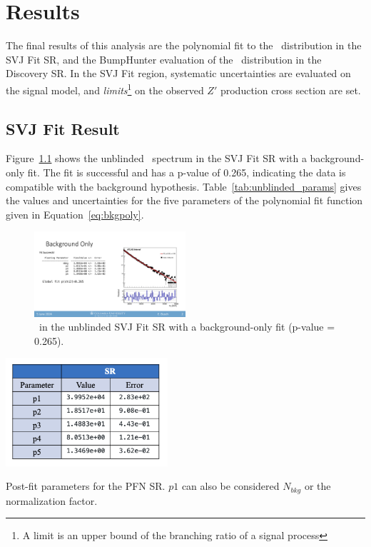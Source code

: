 \chapter{Results}
\label{ch:results}
The final results of this analysis are the polynomial fit to the \mt~distribution in the SVJ Fit SR, and the BumpHunter evaluation of the \mt~distribution in the Discovery SR. In the SVJ Fit region, systematic uncertainties are evaluated on the signal model, and \textit{limits}\footnote{A limit is an upper bound of the branching ratio of a signal process} on the observed $Z'$ production cross section are set. 

\section{SVJ Fit Result}
\label{sec:results_svj}
Figure~\ref{fig:unblinded_PFN_bonly} shows the unblinded \mt~spectrum in the SVJ Fit SR with a background-only fit. 
The fit is successful and has a p-value of 0.265, indicating the data is compatible with the background hypothesis. 
Table~\ref{tab:unblinded_params} gives the values and uncertainties for the five parameters of the polynomial fit function given in Equation~\ref{eq:bkgpoly}. 
\begin{figure}[!htbp]
\centering
   \includegraphics[width=0.5\textwidth]{figures/results/unblinded_PFN_bonly}
    \caption{\mt~in the unblinded SVJ Fit SR with a background-only fit (p-value = 0.265).
    \label{fig:unblinded_PFN_bonly}}
\end{figure}

\begin{table}[!htbp]
\centering
   \includegraphics[width=0.45\textwidth]{figures/results/postfit_param_pfnSR}
    \caption{Post-fit parameters for the PFN SR. $p1$ can also be considered $N_{bkg}$ or the normalization factor.
    \label{tab:unblinded_params}}
\end{table}

